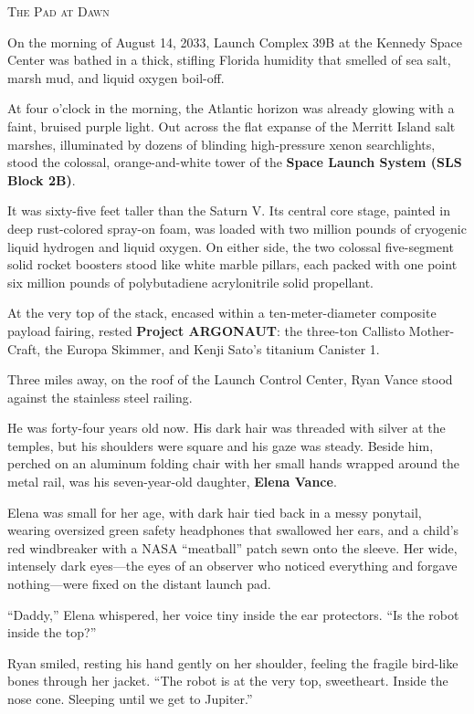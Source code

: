 \documentclass[12pt,twoside,openright]{book}
\newcommand{\sceneheader}[1]{%
  \par\vspace{1.8em}%
  {\noindent\centering\scshape\large #1\par}%
  \vspace{1.0em}%
  \noindent%
}
\begin{document}
\sceneheader{The Pad at Dawn}

On the morning of August 14, 2033, Launch Complex 39B at the Kennedy
Space Center was bathed in a thick, stifling Florida humidity that
smelled of sea salt, marsh mud, and liquid oxygen boil-off.

At four o'clock in the morning, the Atlantic horizon was already glowing
with a faint, bruised purple light. Out across the flat expanse of the
Merritt Island salt marshes, illuminated by dozens of blinding
high-pressure xenon searchlights, stood the colossal, orange-and-white
tower of the \textbf{Space Launch System (SLS Block 2B)}.

It was sixty-five feet taller than the Saturn V. Its central core stage,
painted in deep rust-colored spray-on foam, was loaded with two million
pounds of cryogenic liquid hydrogen and liquid oxygen. On either side,
the two colossal five-segment solid rocket boosters stood like white
marble pillars, each packed with one point six million pounds of
polybutadiene acrylonitrile solid propellant.

At the very top of the stack, encased within a ten-meter-diameter
composite payload fairing, rested \textbf{Project ARGONAUT}: the
three-ton Callisto Mother-Craft, the Europa Skimmer, and Kenji Sato's
titanium Canister 1.

Three miles away, on the roof of the Launch Control Center, Ryan Vance
stood against the stainless steel railing.

He was forty-four years old now. His dark hair was threaded with silver
at the temples, but his shoulders were square and his gaze was steady.
Beside him, perched on an aluminum folding chair with her small hands
wrapped around the metal rail, was his seven-year-old daughter,
\textbf{Elena Vance}.

Elena was small for her age, with dark hair tied back in a messy
ponytail, wearing oversized green safety headphones that swallowed her
ears, and a child's red windbreaker with a NASA ``meatball'' patch sewn
onto the sleeve. Her wide, intensely dark eyes---the eyes of an observer
who noticed everything and forgave nothing---were fixed on the distant
launch pad.

``Daddy,'' Elena whispered, her voice tiny inside the ear protectors.
``Is the robot inside the top?''

Ryan smiled, resting his hand gently on her shoulder, feeling the
fragile bird-like bones through her jacket. ``The robot is at the very
top, sweetheart. Inside the nose cone. Sleeping until we get to
Jupiter.''
\end{document}
